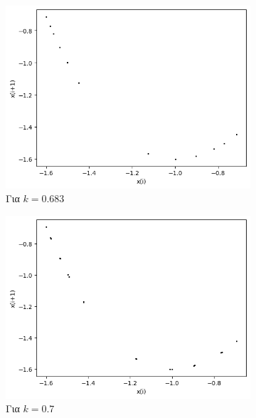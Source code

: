 \begin{figure}[ht]
	\centering
	
	\begin{subfigure}[b]{0.4\textwidth}
		\centering
		\includegraphics[width=\textwidth]{LateX images/graphs q16/g13}
		\caption{Για $k=0.683$}
		\label{f:k84}
	\end{subfigure}
	\hfill
	\begin{subfigure}[b]{0.4\textwidth}
		\centering
		\includegraphics[width=\textwidth]{LateX images/graphs q16/g14}
		\caption{Για $k=0.7$}
		\label{f:k85}
	\end{subfigure}
	\hfill
	\begin{subfigure}[b]{0.4\textwidth}
		\centering

\end{subfigure}
\end{figure}
